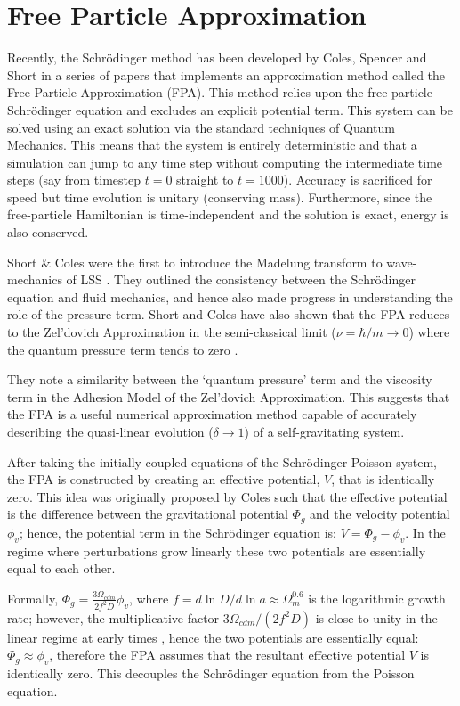 %
\chapter{Free Particle Approximation}
\label{ch_4}
Recently, the Schr\"odinger method has been developed by Coles, Spencer and Short \citep{bib_col, bib_spe, bib_sho, bib_sho2} in a series of papers that implements an approximation method called the Free Particle Approximation (FPA). This method relies upon the free particle Schr\"odinger equation and excludes an explicit potential term. This system can be solved using an exact solution via the standard techniques of Quantum Mechanics. This means that the system is entirely deterministic and that a simulation can jump to any time step without computing the intermediate time steps (say from timestep $t=0$ straight to $t=1000$). Accuracy is sacrificed for speed but time evolution is unitary (conserving mass). Furthermore, since the free-particle Hamiltonian is time-independent and the solution is exact, energy is also conserved.

Short \& Coles were the first to introduce the Madelung transform to wave-mechanics of LSS \citep{bib_sho2}. They outlined the consistency between the Schr\"odinger equation and fluid mechanics, and hence also made progress in understanding the role of the pressure term. Short and Coles have also shown that the FPA reduces to the Zel'dovich Approximation in the semi-classical limit ($\nu = \hbar/m \rightarrow 0$) where the quantum pressure term tends to zero \citep{bib_short}.

They note a similarity between the `quantum pressure' term and the viscosity term in the Adhesion Model of the Zel'dovich Approximation. This suggests that the FPA is a useful numerical approximation method capable of accurately describing the quasi-linear evolution ($\delta \rightarrow 1$) of a self-gravitating system.

After taking the initially coupled equations of the Schr\"odinger-Poisson system, the FPA is constructed by creating an effective potential, $V$, that is identically zero. This idea was originally proposed by Coles such that the effective potential is the difference between the gravitational potential $\Phi_g $ and the velocity potential $\phi_v$; hence, the potential term in the Schr\"odinger equation is: $V =\Phi_g-\phi_v$. In the regime where perturbations grow linearly these two potentials are essentially equal to each other. 

Formally,  $\Phi_g = \frac{3\Omega_{cdm}}{2 f^2 D} \phi_v$, where $f = d\ln D / d\ln a \approx \Omega_m^{0.6}$ is the logarithmic growth rate; however, the multiplicative factor $3\Omega_{cdm}/(2 f^2 D)$ is close to unity in the linear regime at early times \citep{bib_short}, hence the two potentials are essentially equal: $\Phi_g \approx \phi_v$, therefore the FPA assumes that the resultant effective potential $V$ is identically zero. This decouples the Schr\"odinger equation from the Poisson equation.

